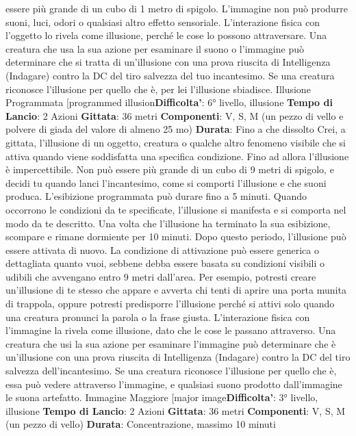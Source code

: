 \begin{multicols}{2}
essere più grande di un cubo di 1 metro di spigolo.
L’immagine non può produrre suoni, luci, odori o
qualsiasi altro effetto sensoriale. L’interazione fisica con
l’oggetto lo rivela come illusione, perché le cose lo
possono attraversare.
Una creatura che usa la sua azione per esaminare il
suono o l’immagine può determinare che si tratta di
un’illusione con una prova riuscita di Intelligenza
(Indagare) contro la DC del tiro salvezza del tuo
incantesimo. Se una creatura riconosce l’illusione per
quello che è, per lei l’illusione sbiadisce.
Illusione Programmata
[programmed illusion\textbf{Difficolta'}:
6° livello, illusione
\textbf{Tempo di Lancio}: 2 Azioni
\textbf{Gittata}: 36 metri
\textbf{Componenti}: V, S, M (un pezzo di vello e polvere di
giada del valore di almeno 25 mo)
\textbf{Durata}: Fino a che dissolto
Crei, a gittata, l’illusione di un oggetto, creatura o
qualche altro fenomeno visibile che si attiva quando
viene soddisfatta una specifica condizione. Fino ad
allora l’illusione è impercettibile. Non può essere più
grande di un cubo di 9 metri di spigolo, e decidi tu
quando lanci l’incantesimo, come si comporti l’illusione
e che suoni produca. L’esibizione programmata può
durare fino a 5 minuti.
Quando occorrono le condizioni da te specificate,
l’illusione si manifesta e si comporta nel modo da te
descritto. Una volta che l’illusione ha terminato la sua
esibizione, scompare e rimane dormiente per 10 minuti.
Dopo questo periodo, l’illusione può essere attivata di
nuovo.
La condizione di attivazione può essere generica o
dettagliata quanto vuoi, sebbene debba essere basata
su condizioni visibili o udibili che avvengano entro 9
metri dall’area. Per esempio, potresti creare un’illusione
di te stesso che appare e avverta chi tenti di aprire una
porta munita di trappola, oppure potresti predisporre
l’illusione perché si attivi solo quando una creatura
pronunci la parola o la frase giusta.
L’interazione fisica con l’immagine la rivela come
illusione, dato che le cose le passano attraverso. Una
creatura che usi la sua azione per esaminare
l’immagine può determinare che è un’illusione con una
prova riuscita di Intelligenza (Indagare) contro la DC del
tiro salvezza dell’incantesimo. Se una creatura
riconosce l’illusione per quello che è, essa può vedere
attraverso l’immagine, e qualsiasi suono prodotto
dall’immagine le suona artefatto.
Immagine Maggiore
[major image\textbf{Difficolta'}:
3° livello, illusione
\textbf{Tempo di Lancio}: 2 Azioni
\textbf{Gittata}: 36 metri
\textbf{Componenti}: V, S, M (un pezzo di vello)
\textbf{Durata}: Concentrazione, massimo 10 minuti

\end{multicols}
